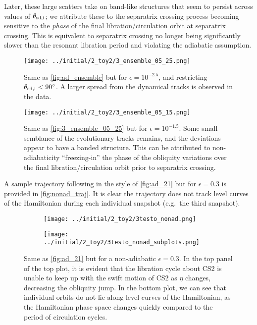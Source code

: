 \documentclass[
        fleqn,
        usenatbib,
        referee,
    ]{mnras}
\begin{document}
Later, these large scatters take on band-like structures that seem to persist
across values of $\theta_{\rm sd, i}$; we attribute these to the separatrix
crossing process becoming sensitive to the \emph{phase} of the final
libration/circulation orbit at separatrix crossing. This is equivalent to
separatrix crossing no longer being significantly slower than the resonant
libration period and violating the adiabatic assumption.
\begin{figure}
    \centering
    \texttt{[image: ../initial/2\_toy2/3\_ensemble\_05\_25.png]}
    \caption{Same as \autoref{fig:ad_ensemble} but for $\epsilon = 10^{-2.5}$,
    and restricting $\theta_{\rm sd, i} < 90^\circ$. A larger spread from the
    dynamical tracks is observed in the data.}\label{fig:3_ensemble_05_25}
\end{figure}
\begin{figure}
    \centering
    \texttt{[image: ../initial/2\_toy2/3\_ensemble\_05\_15.png]}
    \caption{Same as \autoref{fig:3_ensemble_05_25} but for $\epsilon =
    10^{-1.5}$. Some small semblance of the evolutionary tracks remains, and the
    deviations appear to have a banded structure. This can be attributed to
    non-adiabaticity ``freezing-in'' the phase of the obliquity variations over
    the final libration/circulation orbit prior to separatrix
    crossing.}\label{fig:3_ensemble_05_15}
\end{figure}

A sample trajectory following in the style of \autoref{fig:ad_21} but for
$\epsilon = 0.3$ is provided in \autoref{fig:nonad_traj}. It is clear the
trajectory does not track level curves of the Hamiltonian during each individual
snapshot (e.g.\ the third snapshot).
\begin{figure}
    \centering
    \begin{subfigure}{\columnwidth}
        \centering
        \texttt{[image: ../initial/2\_toy2/3testo\_nonad.png]}
    \end{subfigure}
    \begin{subfigure}{\columnwidth}
        \centering
        \texttt{[image: ../initial/2\_toy2/3testo\_nonad\_subplots.png]}
    \end{subfigure}
    \caption{Same as \autoref{fig:ad_21} but for a non-adiabatic $\epsilon =
    0.3$. In the top panel of the top plot, it is evident that the libration
    cycle about CS2 is unable to keep up with the swift motion of CS2 as $\eta$
    changes, decreasing the obliquity jump. In the bottom plot, we can see that
    individual orbits do not lie along level curves of the Hamiltonian, as the
    Hamiltonian phase space changes quickly compared to the period of
    circulation cycles.}\label{fig:nonad_traj}
\end{figure}
\end{document}
